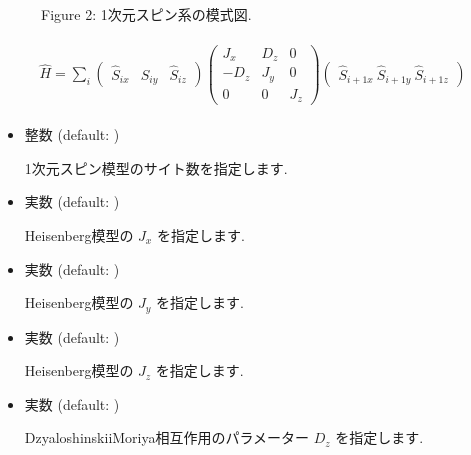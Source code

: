 \documentclass[letterpaper,10pt,dvipdfmx,openany]{sphinxmanual}
\begin{document}
\begin{figure}[htbp]
\centering
\capstart

\noindent{}
\caption{Figure 2: 1次元スピン系の模式図.}\label{\detokenize{shiftk_format_ja:id10}}\label{\detokenize{shiftk_format_ja:spin}}\end{figure}
\begin{equation*}
\begin{split}\begin{align}
  {\hat H} = \sum_{i}
  \left(
  \begin{matrix}
    {\hat S}_{i x} & {\hat S}_{i y} & {\hat S}_{i z}
  \end{matrix}
  \right)
  \left(
  \begin{matrix}
    J_x & D_z & 0 \\
    -D_z & J_y & 0 \\
    0 & 0 & J_z
  \end{matrix}
  \right)
  \left(
  \begin{matrix}
    {\hat S}_{i+1 x} \ {\hat S}_{i+1 y} \ {\hat S}_{i+1 z}
  \end{matrix}
  \right)\end{align}\end{split}
\end{equation*}\begin{itemize}
\item {} 

 整数 (default: )

 1次元スピン模型のサイト数を指定します.

\item {} 

 実数 (default: )

 Heisenberg模型の \(J_x\) を指定します.

\item {} 

 実数 (default: )

 Heisenberg模型の \(J_y\) を指定します.

\item {} 

 実数 (default: )

 Heisenberg模型の \(J_z\) を指定します.

\item {} 

 実数 (default: )

Dzyaloshinskii\sphinxhyphen{}Moriya相互作用のパラメーター \(D_z\) を指定します.

\end{itemize}
\end{document}
